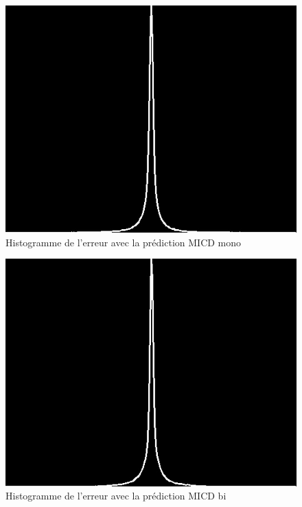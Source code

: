 \documentclass[12pt]{report}
\begin{document}
\begin{figure}[H]
\begin{center}
\includegraphics[scale=0.4]{../ImageRes/HistogrammeErreurMICDmonoQ1.jpg} 
\caption{Histogramme de l'erreur avec la prédiction MICD mono}
\end{center}
\end{figure}

\begin{figure}[H]
\begin{center}
\includegraphics[scale=0.4]{../ImageRes/HistogrammeErreurMICDbiQ1.jpg} 
\caption{Histogramme de l'erreur avec la prédiction MICD bi}
\end{center}
\end{figure}
\end{document}
